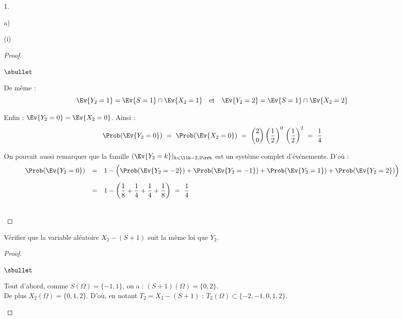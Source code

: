 \documentclass[11pt]{article}%
\begin{document}
\begin{noliste}{1.}
\begin{noliste}{a)}
\begin{nonoliste}{(i)}
\begin{proof}
\begin{noliste}{$\sbullet$}
          \newpage

          
        \item De même :
          \[
            \Ev{Y_2 = 1} = \Ev{S = 1} \cap \Ev{X_2 = 1} \quad
            \text{et} \quad \Ev{Y_2 = 2} = \Ev{S = 1} \cap \Ev{X_2 =
              2}
          \]
          
        \item Enfin : $\Ev{Y_2 = 0} = \Ev{X_2 = 0}$. Ainsi :
          \[
            \Prob(\Ev{Y_2  = 0}) \ = \ \Prob(\Ev{X_2 = 0}) \ = \
            \dbinom{2}{0} \left(\dfrac{1}{2}\right)^0 \,
            \left(\dfrac{1}{2}\right)^2 \ = \ \dfrac{1}{4}
          \]
        \end{noliste}
        \begin{remark}
          On pouvait aussi remarquer que la famille $(\Ev{Y_2 = k})_{k
            \in \llb -2, 2\rrb}$ est un système complet
          d'événements. D'où :
          \[
            \begin{array}{rcl}
              \Prob(\Ev{Y_2 = 0})
              & = & 1-\Big(\Prob(\Ev{Y_2 = -2}) +
                    \Prob(\Ev{Y_2 = -1}) + \Prob(\Ev{Y_2 = 1}) +
                    \Prob(\Ev{Y_2  = 2})\Big)
              \\[.4cm]
              & = & 1 - \left(\dfrac{1}{8} + \dfrac{1}{4} +
                    \dfrac{1}{4} + \dfrac{1}{8}\right) \ = \ \dfrac{1}{4}
            \end{array}
          \]
        \end{remark}~\\[-1.4cm]
      \end{proof}
    \end{nonoliste}
    
  \item Vérifier que la variable aléatoire $X_2 - (S+1)$ suit la même
    loi que $Y_2$.
    \begin{proof}~
      \begin{noliste}{$\sbullet$}
      \item Tout d'abord, comme $S(\Omega) = \{-1,1\}$, on a :
        $(S+1)(\Omega) = \{0,2\}$.\\
        De plus $X_2(\Omega) = \{0,1,2\}$. D'où, en notant $T_2 = X_2
        - (S+1)$ : $T_2(\Omega) \subset \{-2,-1,0,1,2\}$.
        

\end{noliste}
\end{proof}
\end{noliste}
\end{noliste}
\end{document}

